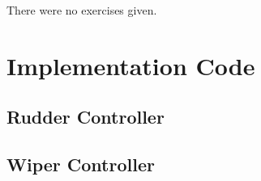 \documentclass[11pt]{article}
\begin{document}
There were no exercises given.

\clearpage
\section{Implementation Code}

\subsection{Rudder Controller}
\begingroup
\fontsize{11pt}{13pt}



\endgroup

\clearpage
\subsection{Wiper Controller}
\begingroup
\fontsize{9pt}{10pt}



\endgroup
\end{document}
